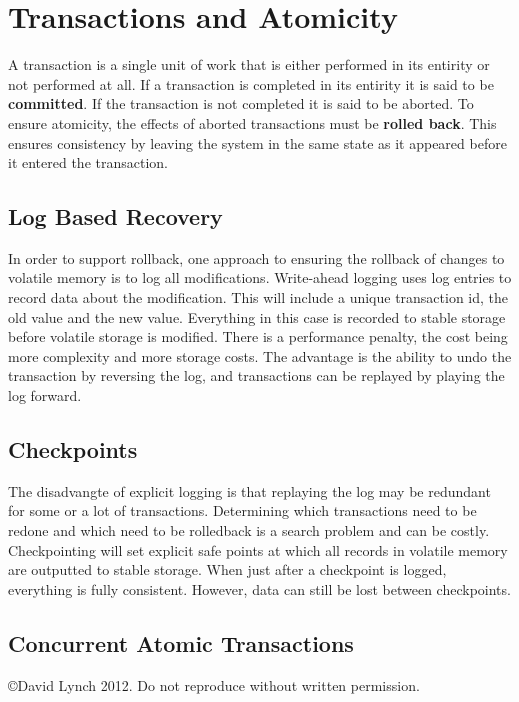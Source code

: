 \documentclass[10pt,a4paper]{article}
\begin{document}
\section{Transactions and Atomicity}
A transaction is a single unit of work that is either performed in its entirity or not performed at all. If a transaction is completed in its entirity it is said to be {\bf committed}. If the transaction is not completed it is said to be aborted. To ensure atomicity, the effects of aborted transactions must be {\bf rolled back}. This ensures consistency by leaving the system in the same state as it appeared before it entered the transaction.  
\subsection{Log Based Recovery}
In order to support rollback, one approach to ensuring the rollback of changes to volatile memory is to log all modifications. Write-ahead logging uses log entries to record data about the modification. This will include a unique transaction id, the old value and the new value. Everything in this case is recorded to stable storage before volatile storage is modified. There is a performance penalty, the cost being more complexity and more storage costs. The advantage is the ability to undo the transaction by reversing the log, and transactions can be replayed  by playing the log forward. 
\subsection{Checkpoints}
The disadvangte of explicit logging is that replaying the log may be redundant for some or a lot of transactions. Determining which transactions need to be redone and which need to be rolledback is a search problem and can be costly. Checkpointing will set explicit safe points at which all records in volatile memory are outputted to stable storage. When just after a checkpoint is logged, everything is fully consistent. However, data can still be lost between checkpoints. 
\subsection{Concurrent Atomic Transactions}


{}

\begin{center}
{\small \copyright  David Lynch 2012. Do not reproduce without written permission.}
\end{center}
\end{document}
